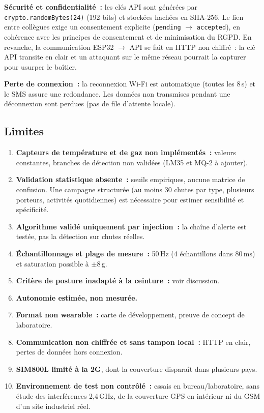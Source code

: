 \documentclass[12pt,a4paper]{article}
\renewcommand{\_}{\textunderscore\allowbreak}
\begin{document}
\textbf{Sécurité et confidentialité~:} les clés API sont générées par \texttt{crypto.randomBytes(24)} (192 bits) et stockées hachées en SHA-256. Le lien entre collègues exige un consentement explicite (\texttt{pending} $\rightarrow$ \texttt{accepted}), en cohérence avec les principes de consentement et de minimisation du RGPD. En revanche, la communication ESP32 $\rightarrow$ API se fait en HTTP non chiffré~: la clé API transite en clair et un attaquant sur le même réseau pourrait la capturer pour usurper le boîtier.

\textbf{Perte de connexion~:} la reconnexion Wi-Fi est automatique (toutes les 8\,s) et le SMS assure une redondance. Les données non transmises pendant une déconnexion sont perdues (pas de file d'attente locale).

\subsection{Limites}
\label{sec:limites}

\begin{enumerate}
    \item \textbf{Capteurs de température et de gaz non implémentés~:} valeurs constantes, branches de détection non validées (LM35 et MQ-2 à ajouter).
    \item \textbf{Validation statistique absente~:} seuils empiriques, aucune matrice de confusion. Une campagne structurée (au moins 30 chutes par type, plusieurs porteurs, activités quotidiennes) est nécessaire pour estimer sensibilité et spécificité.
    \item \textbf{Algorithme validé uniquement par injection~:} la chaîne d'alerte est testée, pas la détection sur chutes réelles.
    \item \textbf{Échantillonnage et plage de mesure~:} 50\,Hz (4 échantillons dans 80\,ms) et saturation possible à $\pm$8\,g.
    \item \textbf{Critère de posture inadapté à la ceinture~:} voir discussion.
    \item \textbf{Autonomie estimée, non mesurée.}
    \item \textbf{Format non wearable~:} carte de développement, preuve de concept de laboratoire.
    \item \textbf{Communication non chiffrée et sans tampon local~:} HTTP en clair, pertes de données hors connexion.
    \item \textbf{SIM800L limité à la 2G}, dont la couverture disparaît dans plusieurs pays.
    \item \textbf{Environnement de test non contrôlé~:} essais en bureau/laboratoire, sans étude des interférences 2,4\,GHz, de la couverture GPS en intérieur ni du GSM d'un site industriel réel.
\end{enumerate}
\end{document}
